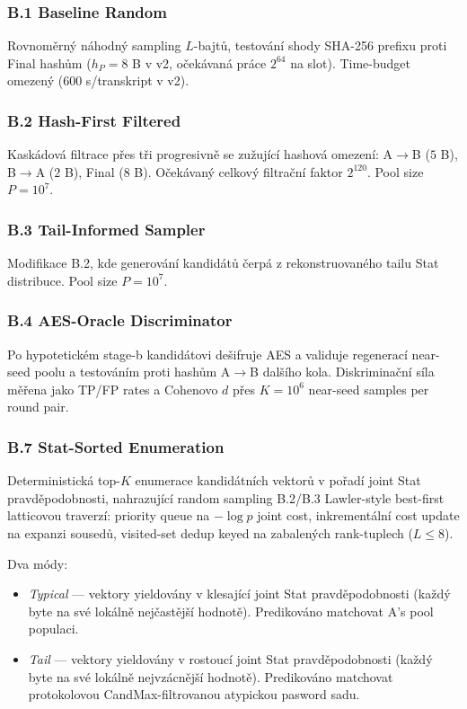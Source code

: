 \documentclass[11pt,a4paper]{article}
\begin{document}
\subsubsection{B.1 Baseline Random}\label{sec:adv-b1}
Rovnoměrný náhodný sampling $L$-bajtů, testování shody SHA-256 prefixu proti Final hashům ($h_P = 8$ B v v2, očekávaná práce $2^{64}$ na slot). Time-budget omezený ($600$ s/transkript v v2).

\subsubsection{B.2 Hash-First Filtered}\label{sec:adv-b2}
Kaskádová filtrace přes tři progresivně se zužující hashová omezení: A$\to$B ($5$ B), B$\to$A ($2$ B), Final ($8$ B). Očekávaný celkový filtrační faktor $2^{120}$. Pool size $P = 10^7$.

\subsubsection{B.3 Tail-Informed Sampler}\label{sec:adv-b3}
Modifikace B.2, kde generování kandidátů čerpá z rekonstruovaného tailu Stat distribuce. Pool size $P = 10^7$.

\subsubsection{B.4 AES-Oracle Discriminator}\label{sec:adv-b4}
Po hypotetickém stage-b kandidátovi dešifruje AES a validuje regenerací near-seed poolu a testováním proti hashům A$\to$B dalšího kola. Diskriminační síla měřena jako TP/FP rates a Cohenovo $d$ přes $K = 10^6$ near-seed samples per round pair.

\subsubsection{B.7 Stat-Sorted Enumeration}\label{sec:adv-b7}
Deterministická top-$K$ enumerace kandidátních vektorů v pořadí joint Stat pravděpodobnosti, nahrazující random sampling B.2/B.3 Lawler-style best-first latticovou traverzí: priority queue na $-\log p$ joint cost, inkrementální cost update na expanzi sousedů, visited-set dedup keyed na zabalených rank-tuplech ($L \le 8$).

Dva módy:
\begin{itemize}[leftmargin=*]
\item \emph{Typical} — vektory yieldovány v klesající joint Stat pravděpodobnosti (každý byte na své lokálně nejčastější hodnotě). Predikováno matchovat A's pool populaci.
\item \emph{Tail} — vektory yieldovány v rostoucí joint Stat pravděpodobnosti (každý byte na své lokálně nejvzácnější hodnotě). Predikováno matchovat protokolovou CandMax-filtrovanou atypickou pasword sadu.
\end{itemize}
\end{document}
